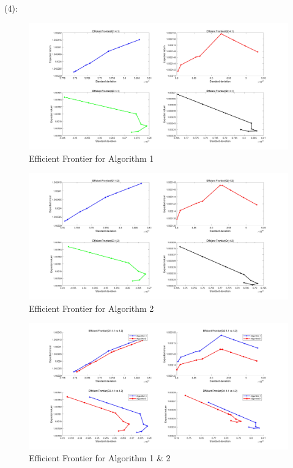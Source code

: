 \documentclass[11pt,a4paper]{article}
\begin{document}
(4):
\begin{figure}[H] 
	\centering 
	\includegraphics[width=1\textwidth]{41.jpg} %
	\caption{Efficient Frontier for Algorithm 1} 
	\label{Fig.main1} 
\end{figure}
\begin{figure}[H] 
	\centering 
	\includegraphics[width=1\textwidth]{42.jpg} %
	\caption{Efficient Frontier for Algorithm 2} 
	\label{Fig.main2} 
\end{figure}
\begin{figure}[H] 
	\centering 
	\includegraphics[width=1\textwidth]{412.jpg} %
	\caption{Efficient Frontier for Algorithm 1 \& 2} 
	\label{Fig.main3} 
\end{figure}
\end{document}
